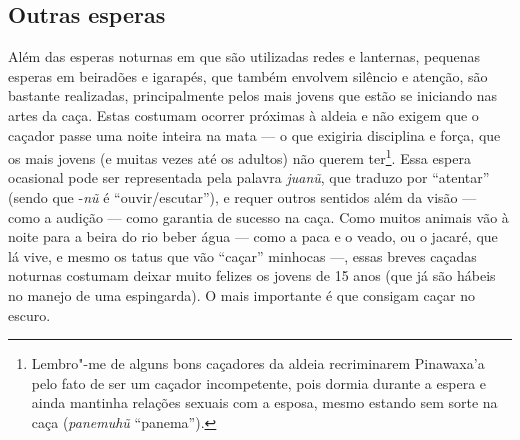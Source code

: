 \subsection{Outras esperas}

\forceindent
Além das esperas noturnas em que são utilizadas redes e lanternas,
pequenas esperas em beiradões e igarapés, que também envolvem silêncio e
atenção, são bastante realizadas, principalmente pelos mais jovens que
estão se iniciando nas artes da caça. Estas costumam ocorrer próximas à
aldeia e não exigem que o caçador passe uma noite inteira na mata --- o
que exigiria disciplina e força, que os mais jovens (e muitas vezes até
os adultos) não querem ter\footnote{Lembro"-me de alguns bons caçadores
  da aldeia recriminarem Pinawaxa'a pelo fato de ser um caçador
  incompetente, pois dormia durante a espera e ainda mantinha relações
  sexuais com a esposa, mesmo estando sem sorte na caça (\emph{panemuhũ}
  ``panema'').}. Essa espera ocasional pode ser representada pela palavra
\emph{juanũ}, que traduzo por ``atentar'' (sendo que -\emph{nũ} é
``ouvir/escutar''), e requer outros sentidos além da visão --- como a
audição --- como garantia de sucesso na caça. Como muitos animais vão à
noite para a beira do rio beber água --- como a paca e o veado, ou o
jacaré, que lá vive, e mesmo os tatus que vão ``caçar'' minhocas ---, essas
breves caçadas noturnas costumam deixar muito felizes os jovens de 15
anos (que já são hábeis no manejo de uma espingarda). O mais importante
é que consigam caçar no escuro.

